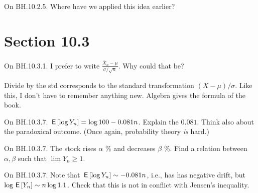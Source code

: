 \begin{exercise}
On BH.10.2.5. Where have we applied this idea earlier?
\end{exercise}



\section{Section 10.3}
\label{sec:section-10.3}

\begin{exercise}
On BH.10.3.1. I prefer to write $\frac{\bar X_n-\mu}{\sigma/\sqrt n}$. Why could that be?
\begin{solution}
Divide by the std corresponds to the standard transformation $(X-\mu)/\sigma$. Like this, I don't have to remember anything new. Algebra gives the formula of the book.
\end{solution}
\end{exercise}


\begin{exercise}
On BH.10.3.7. $\,\mathsf{E}\left[\log Y_n\right]=\log 100 - 0.081n$. Explain the $0.081$. Think also about the paradoxical outcome. (Once again, probability theory \emph{is} hard.)
\begin{hint}
\end{hint}
\begin{solution}
\end{solution}
\end{exercise}

\begin{exercise}
On BH.10.3.7. The stock rises $\alpha$ \% and decreases $\beta$ \%. Find a relation between  $\alpha, \beta$  such that $\lim Y_{n}\geq 1$.
\begin{hint}
\end{hint}
\begin{solution}
\end{solution}
\end{exercise}

\begin{exercise}
On BH.10.3.7. Note that $\,\mathsf{E}\left[\log Y_n\right] \sim -0.081 n$, i.e., has has negative drift, but $\log \,\mathsf{E}\left[Y_n\right] \sim n \log 1.1$. Check that this is not in conflict with Jensen's inequality.
\begin{hint}
\end{hint}
\begin{solution}
\end{solution}
\end{exercise}



